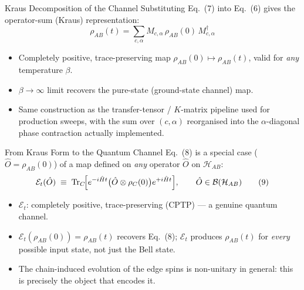 \documentclass[11pt]{beamer}
\renewcommand{\Tr}{\mathrm{Tr}}
\begin{document}
\begin{frame}{Kraus Decomposition of the Channel}
Substituting Eq.\ (7) into Eq.\ (6) gives the operator-sum (Kraus) representation:
\[
\boxed{\;\rho_{AB}(t) = \sum_{c,\alpha} M_{c,\alpha}\,\rho_{AB}(0)\,M_{c,\alpha}^\dagger\;} \tag{8}
\]

\vspace{6pt}
\begin{itemize}
\item Completely positive, trace-preserving map $\rho_{AB}(0) \mapsto \rho_{AB}(t)$, valid for \emph{any} temperature $\beta$.
\item $\beta\to\infty$ limit recovers the pure-state (ground-state channel) map.
\item Same construction as the transfer-tensor / $K$-matrix pipeline used for production sweeps, with the sum over $(c,\alpha)$ reorganised into the $\alpha$-diagonal phase contraction actually implemented.
\end{itemize}
\end{frame}

\begin{frame}{From Kraus Form to the Quantum Channel}
Eq.\ (8) is a special case ($\hat O = \rho_{AB}(0)$) of a map defined on \emph{any} operator $\hat O$ on $\mathcal{H}_{AB}$:
\[
\mathcal{E}_t(\hat O) \;\equiv\; \Tr_C\!\Bigl[e^{-i\hat H t}\bigl(\hat O\otimes\rho_C(0)\bigr)e^{+i\hat H t}\Bigr], \qquad \hat O\in\mathcal{B}(\mathcal{H}_{AB}) \tag{9}
\]

\begin{itemize}
\item $\mathcal{E}_t$: completely positive, trace-preserving (CPTP) — a genuine quantum channel.
\item $\mathcal{E}_t(\rho_{AB}(0)) = \rho_{AB}(t)$ recovers Eq.\ (8); $\mathcal{E}_t$ produces $\rho_{AB}(t)$ for \emph{every} possible input state, not just the Bell state.
\item The chain-induced evolution of the edge spins is non-unitary in general: this is precisely the object that encodes it.
\end{itemize}
\end{frame}
\end{document}

